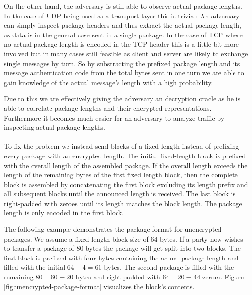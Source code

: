 On the other hand, the adversary is still able to observe actual package lengths.
In the case of UDP being used as a transport layer this is trivial:
An adversary can simply inspect package headers and thus extract the actual package length, as data is in the general case sent in a single package.
In the case of TCP where no actual package length is encoded in the TCP header this is a little bit more involved but in many cases still feasible as client and server are likely to exchange single messages by turn.
So by substracting the prefixed package length and its message authentication code from the total bytes sent in one turn we are able to gain knowledge of the actual message's length with a high probability.

Due to this we are effectively giving the adversary an decryption oracle as he is able to correlate package lengths and their encrypted representations.
Furthermore it becomes much easier for an adversary to analyze traffic by inspecting actual package lengths.
\\\\

To fix the problem we instead send blocks of a fixed length instead of prefixing every package with an encrypted length.
The initial fixed-length block is prefixed with the overall length of the assembled package.
If the overall length exceeds the length of the remaining bytes of the first fixed length block, then the complete block is assembled by concatenating the first block excluding its length prefix and all subsequent blocks until the announced length is received.
The last block is right-padded with zeroes until its length matches the block length.
The package length is only encoded in the first block.

The following example demonstrates the package format for unencrypted packages.
We assume a fixed length block size of 64 bytes.
If a party now wishes to transfer a package of 80 bytes the package will get split into two blocks.
The first block is prefixed with four bytes containing the actual package length and filled with the initial $64 - 4 = 60$ bytes.
The second package is filled with the remaining $80 - 60 = 20$ bytes and right-padded with $64 - 20 = 44$ zeroes.
Figure \ref{fig:unencrypted-package-format} visualizes the block's contents.

